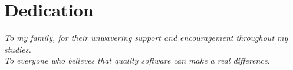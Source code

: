 
\chapter*{Dedication}

\begin{center}
\vspace*{3cm}
\textit{To my family, for their unwavering support and encouragement throughout my studies.}\\[2em]
\textit{To everyone who believes that quality software can make a real difference.}
\end{center}
